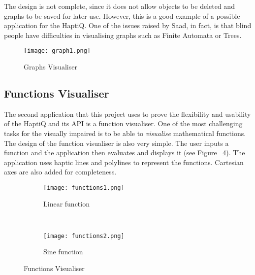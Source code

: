 The design is not complete, since it does not allow objects to be deleted and graphs to be saved for later use. However, this is a good example of a possible application for the HaptiQ. One of the issues raised by Saad, in fact, is that blind people have difficulties in visualising graphs such as Finite Automata or Trees. 

\begin{figure}[H]
  \centering
  \texttt{[image: graph1.png]}
  \caption{Graphs Visualiser}
  \label{fig:graphsVis}
\end{figure}

\subsection{Functions Visualiser}
\label{sec:funcVis}

The second application that this project uses to prove the flexibility and usability of the HaptiQ and its API is a function visualiser. One of the most challenging tasks for the visually impaired is to be able to \textit{visualise} mathematical functions. The design of the function visualiser is also very simple. The user inputs a function and the application then evaluates and displays it (see Figure ~\ref{fig:funcVisualiser}). The application uses haptic lines and polylines to represent the functions. Cartesian axes are also added for completeness.

\begin{figure}[H]
        \centering
        \begin{subfigure}[H]{0.4\textwidth}
                \texttt{[image: functions1.png]}
                \caption{Linear function}
                \label{fig:funct1}
        \end{subfigure}%
        ~ %
        \begin{subfigure}[H]{0.4\textwidth}
                \texttt{[image: functions2.png]}
                \caption{Sine function}
                \label{fig:funct2}
        \end{subfigure}
        \caption{Functions Visualiser}\label{fig:funcVisualiser}
\end{figure}
